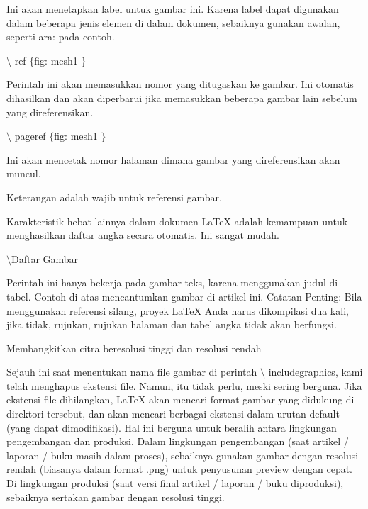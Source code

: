 \noindent 
Ini akan menetapkan label untuk gambar ini. Karena label dapat digunakan dalam beberapa jenis elemen di dalam dokumen, sebaiknya gunakan awalan, seperti ara: pada contoh. \par
\vspace{12pt}
\noindent 
 $  \setminus $ ref  $  \{  $fig: mesh1 $  \}  $ \par
\noindent 
Perintah ini akan memasukkan nomor yang ditugaskan ke gambar. Ini otomatis dihasilkan dan akan diperbarui jika memasukkan beberapa gambar lain sebelum yang direferensikan. \par
\vspace{12pt}
\noindent 
 $  \setminus $ pageref  $  \{  $fig: mesh1 $  \}  $ \par
\noindent 
Ini akan mencetak nomor halaman dimana gambar yang direferensikan akan muncul. \par
\vspace{12pt}
\noindent 
Keterangan adalah wajib untuk referensi gambar. \par
\vspace{12pt}
\noindent 
Karakteristik hebat lainnya dalam dokumen LaTeX adalah kemampuan untuk menghasilkan daftar angka secara otomatis. Ini sangat mudah. \par
\vspace{12pt}
\noindent 
 $  \setminus $Daftar Gambar \par
\vspace{12pt}
\vspace{16pt}
\noindent 
Perintah ini hanya bekerja pada gambar teks, karena menggunakan judul di tabel. Contoh di atas mencantumkan gambar di artikel ini. Catatan Penting: Bila menggunakan referensi silang, proyek LaTeX Anda harus dikompilasi dua kali, jika tidak, rujukan, rujukan halaman dan tabel angka tidak akan berfungsi. \par
\vspace{16pt}
\noindent 
Membangkitkan citra beresolusi tinggi dan resolusi rendah \par
\vspace{12pt}
\noindent 
 \hspace*{0.5in} Sejauh ini saat menentukan nama file gambar di perintah  $  \setminus $ includegraphics, kami telah menghapus ekstensi file. Namun, itu tidak perlu, meski sering berguna. Jika ekstensi file dihilangkan, LaTeX akan mencari format gambar yang didukung di direktori tersebut, dan akan mencari berbagai ekstensi dalam urutan default (yang dapat dimodifikasi). Hal ini berguna untuk beralih antara lingkungan pengembangan dan produksi. Dalam lingkungan pengembangan (saat artikel / laporan / buku masih dalam proses), sebaiknya gunakan gambar dengan resolusi rendah (biasanya dalam format .png) untuk penyusunan preview dengan cepat. Di lingkungan produksi (saat versi final artikel / laporan / buku diproduksi), sebaiknya sertakan gambar dengan resolusi tinggi. \par
